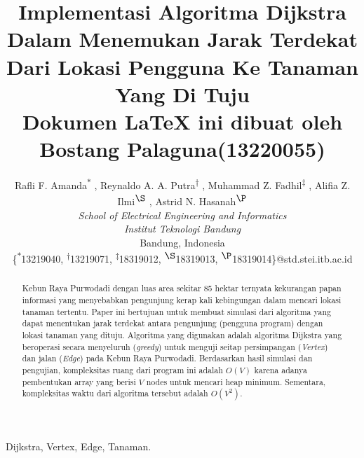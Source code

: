 \documentclass[conference]{IEEEtran}
\begin{document}
\title
{
    Implementasi Algoritma Dijkstra Dalam
    Menemukan Jarak Terdekat Dari Lokasi Pengguna
    Ke Tanaman Yang Di Tuju\\
    {\footnotesize Dokumen LaTeX ini dibuat oleh \textbf{Bostang Palaguna(13220055)} }
}
\author
{
    Rafli F. Amanda\textsuperscript{$\ast$}
    , Reynaldo A. A. Putra\textsuperscript{$\dag$}
    , Muhammad Z. Fadhil\textsuperscript{$\ddag$}
    , Alifia Z. Ilmi\textsuperscript{$\S$}
    , Astrid N. Hasanah\textsuperscript{$\P$}
    \\
    \textit{School of Electrical Engineering and Informatics}
    \\
    \textit{Institut Teknologi Bandung}
    \\
    Bandung, Indonesia
    \\
    \{\textsuperscript{$\ast$}13219040, \textsuperscript{$\dag$}13219071, \textsuperscript{$\ddag$}18319012, \textsuperscript{$\S$}18319013, \textsuperscript{$\P$}18319014\}@std.stei.itb.ac.id
}

\maketitle


\begin{abstract}
    Kebun Raya Purwodadi dengan luas area sekitar 85
    hektar ternyata kekurangan papan informasi yang menyebabkan
    pengunjung kerap kali kebingungan dalam mencari lokasi tanaman tertentu. Paper ini bertujuan untuk membuat simulasi
    dari algoritma yang dapat menentukan jarak terdekat antara
    pengunjung (pengguna program) dengan lokasi tanaman yang
    dituju. Algoritma yang digunakan adalah algoritma Dijkstra
    yang beroperasi secara menyeluruh (\textit{greedy}) untuk menguji
    seitap persimpangan (\textit{Vertex}) dan jalan (\textit{Edge}) pada Kebun
    Raya Purwodadi. Berdasarkan hasil simulasi dan pengujian,
    kompleksitas ruang dari program ini adalah $O(V)$ karena adanya
    pembentukan array yang berisi $V$ nodes untuk mencari heap minimum. Sementara, kompleksitas waktu dari algoritma tersebut
    adalah $O(V^2)$.
\end{abstract}

\begin{IEEEkeywords}
    Dijkstra, Vertex, Edge, Tanaman.
\end{IEEEkeywords}
\end{document}
